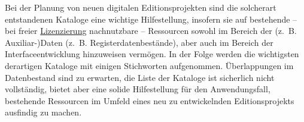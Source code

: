 \documentclass{article}
\begin{document}
        Bei der Planung von neuen digitalen Editionsprojekten sind die solcherart
                     entstandenen Kataloge eine wichtige Hilfestellung, insofern sie auf bestehende –
                     bei freier \href{http://gams.uni-graz.at/o:konde.119}{Lizenzierung}
                     nachnutzbare – Ressourcen sowohl im Bereich der (z. B. Auxiliar-)Daten (z. B.
                     Registerdatenbestände), aber auch im Bereich der Interfaceentwicklung hinzuweisen
                     vermögen. In der Folge werden die wichtigsten derartigen Kataloge mit einigen
                     Stichworten aufgenommen. Überlappungen im Datenbestand sind zu erwarten, die Liste
                     der Kataloge ist sicherlich nicht vollständig, bietet aber eine solide
                     Hilfestellung für den Anwendungsfall, bestehende Ressourcen im Umfeld eines neu zu
                     entwickelnden Editionsprojekts ausfindig zu machen.\\
            
\end{document}
